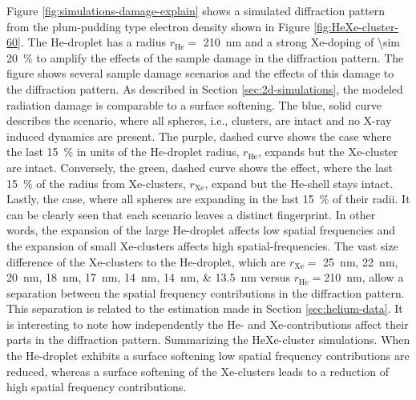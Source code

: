 Figure \ref{fig:simulations-damage-explain} shows a simulated diffraction pattern from the plum-pudding type electron density shown in Figure \ref{fig:HeXe-cluster-60}. The He-droplet has a radius $r_{\text{He}}=$ \SI{210}{\nano\meter} and a strong Xe-doping of \SI{\sim 20}{\percent} to amplify the effects of the sample damage in the diffraction pattern. The figure shows several sample damage scenarios and the effects of this damage to the diffraction pattern. As described in Section \ref{sec:2d-simulations}, the modeled radiation damage is comparable to a surface softening. The blue, solid curve describes the scenario, where all spheres, i.e., clusters, are intact and no X-ray induced dynamics are present. The purple, dashed curve shows the case where the last \SI{15}{\percent} in units of the He-droplet radius, $r_{\text{He}}$, expands but the Xe-cluster are intact. Conversely, the green, dashed curve shows the effect, where the last \SI{15}{\percent} of the radius from Xe-clusters, $r_{\text{Xe}}$, expand but the He-shell stays intact. Lastly, the case, where all spheres are expanding in the last \SI{15}{\percent} of their radii. It can be clearly seen that each scenario leaves a distinct fingerprint. In other words, the expansion of the large He-droplet affects low spatial frequencies and the expansion of small Xe-clusters affects high spatial-frequencies.
The vast size difference of the Xe-clusters to the He-droplet, which are $r_{\text{Xe}}=$ \SIlist{25;22;20;18;17;14;14;13.5}{\nano\meter} versus $r_{\text{He}}=$\SI{210}{\nano\meter}, allow a separation between the spatial frequency contributions in the diffraction pattern. This separation is related to the estimation made in Section \ref{sec:helium-data}. It is interesting to note how independently the He- and Xe-contributions affect their parts in the diffraction pattern. 
Summarizing the HeXe-cluster simulations. When the He-droplet exhibits a surface softening low spatial frequency contributions are reduced, whereas a surface softening of the Xe-clusters leads to a reduction of high spatial frequency contributions.\\[1\baselineskip]
